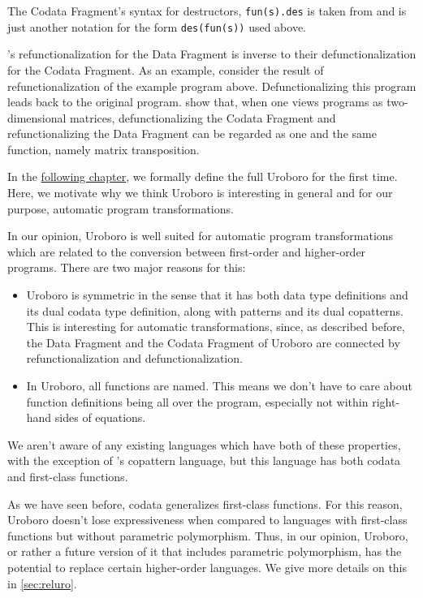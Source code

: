 The Codata Fragment's syntax for destructors, \texttt{fun(s).des} is taken from \citet{abel13copatterns} and is just another notation for the form \texttt{des(fun(s))} used above.

\citet{rendel15automatic}'s refunctionalization for the Data Fragment is inverse to their defunctionalization for the Codata Fragment. As an example, consider the result of refunctionalization of the example program above. Defunctionalizing this program leads back to the original program. \citeauthor{rendel15automatic} show that, when one views programs as two-dimensional matrices, defunctionalizing the Codata Fragment and refunctionalizing the Data Fragment can be regarded as one and the same function, namely matrix transposition.

In the \hyperref[ch:uro]{following chapter}, we formally define the full Uroboro for the first time. Here, we motivate why we think Uroboro is interesting in general and for our purpose, automatic program transformations.

In our opinion, Uroboro is well suited for automatic program transformations which are related to the conversion between first-order and higher-order programs. There are two major reasons for this:
\begin{itemize}
\item Uroboro is symmetric in the sense that it has both data type definitions and its dual codata type definition, along with patterns and its dual copatterns. This is interesting for automatic transformations, since, as described before, the Data Fragment and the Codata Fragment of Uroboro are connected by refunctionalization and defunctionalization.

\item In Uroboro, all functions are named. This means we don't have to care about function definitions being all over the program, especially not within right-hand sides of equations.
\end{itemize}
We aren't aware of any existing languages which have both of these properties, with the exception of \citet{abel13copatterns}'s copattern language, but this language has both codata and first-class functions.

As we have seen before, codata generalizes first-class functions. For this reason, Uroboro doesn't lose expressiveness when compared to languages with first-class functions but without parametric polymorphism. Thus, in our opinion, Uroboro, or rather a future version of it that includes parametric polymorphism, has the potential to replace certain higher-order languages. We give more details on this in \autoref{sec:reluro}.

